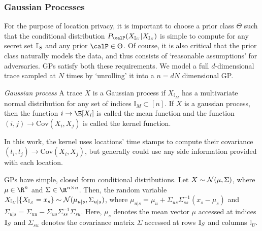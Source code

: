\subsubsection{Gaussian Processes}
For the purpose of location privacy, it is important to choose a prior class $\Theta$ such that the conditional distribution $P_\calP(\Xu | \Xs)$ is simple to compute for any secret set ${\mathbb{I}_S}$ and any prior $\calP \in \Theta$. Of course, it is also critical that the prior class naturally models the data, and thus consists of `reasonable assumptions' for adversaries. GPs satisfy both these requirements. We model a full $d$-dimensional trace sampled at $N$ times by `unrolling' it into a $n = dN$ dimensional GP. 
\begin{definition}\emph{Gaussian process} 
	A trace $X$ is a Gaussian process if $X_{\mathbb{I}_M}$ has a multivariate normal distribution for any set of indices $\mathbb{I}_M \subset [n]$. If $X$ is a gaussian process, then the function $i \rightarrow \E[X_i]$ is called the mean function and the function $(i,j) \rightarrow \text{Cov}(X_i, X_j)$ is called the kernel function. 
\end{definition}
In this work, the kernel uses locations' time stamps to compute their covariance $(t_i, t_j) \rightarrow \text{Cov}(X_i, X_j)$, but generally could use any side information provided with each location. 


GPs have simple, closed form conditional distributions. Let $X \sim \mathcal{N}(\mu, \Sigma)$, where $\mu \in \R^{n}$ and $\Sigma \in \R^{{n} \times {n}}$. Then, the random variable ${X_{\mathbb{I}_U}} | \{{X_{\mathbb{I}_S}} = x_s\} \sim \mathcal{N}(\mu_{u|s}, \Sigma_{u|s})$, where $\mu_{u|s} = \mu_u + \Sigma_{us} \Sigma_{ss}^{-1} (x_s - \mu_s)$ and $\Sigma_{u|s} = \Sigma_{uu} - \Sigma_{us}\Sigma_{ss}^{-1} \Sigma_{su}$. Here, $\mu_s$ denotes the mean vector $\mu$ accessed at indices ${\mathbb{I}_S}$ and $\Sigma_{su}$ denotes the covariance matrix $\Sigma$ accessed at rows ${\mathbb{I}_S}$ and columns $\mathbb{I}_U$. 

